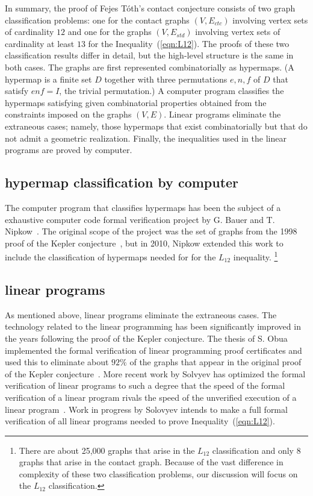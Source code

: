 \documentclass{llncs}
\begin{document}
In summary, the proof of Fejes T\'oth's contact conjecture consists of
two graph classification problems: one for the contact graphs
$(V,E_{ctc})$ involving vertex sets of cardinality $12$ and one for
the graphs $(V,E_{std})$ involving vertex sets of cardinality at least
$13$ for the Inequality~(\ref{eqn:L12}).  The proofs of these two
classification results differ in detail, but the high-level structure
is the same in both cases.  The graphs are first represented
combinatorially as hypermaps.  (A hypermap is a finite set $D$
together with three permutations $e,n,f$ of $D$ that satisfy $e n f =
I$, the trivial permutation.)  A computer program classifies the
hypermaps satisfying given combinatorial properties obtained from the
constraints imposed on the graphs $(V,E)$.  Linear programs eliminate
the extraneous cases; namely, those hypermaps that exist
combinatorially but that do not admit a geometric realization.
Finally, the inequalities used in the linear programs are proved by
computer.

\subsection{hypermap classification by computer}

The computer program that classifies hypermaps has been the subject of
a exhaustive computer code formal verification project by G. Bauer and
T. Nipkow~\cite{Nipkow:2005:Tame}.  The original scope of the project
was the set of graphs from the 1998 proof of the Kepler
conjecture~\cite{Hales:2006:DCG}, but in 2010, Nipkow extended this
work to include the classification of hypermaps needed for for the
$L_{12}$ inequality.  \footnote{There are about 25,000 graphs that
  arise in the $L_{12}$ classification and only $8$ graphs that arise
  in the contact graph.  Because of the vast difference in complexity
  of these two classification problems, our discussion will focus on
  the $L_{12}$ classification.}


\subsection{linear programs}

As mentioned above, linear programs eliminate the extraneous cases.
The technology related to the linear programming has been
significantly improved in the years following the proof of the Kepler
conjecture.  The thesis of S. Obua implemented
the formal verification of linear programming proof certificates and
used this to eliminate about $92\%$ of the graphs that appear in the
original proof of the Kepler conjecture~\cite{Obua:2008:Thesis}.  More
recent work by Solvyev has optimized the formal verification of linear
programs to such a degree that the speed of the formal verification of
a linear program rivals the speed of the unverified execution of a
linear program~\cite{Solovyev:LP}.  Work in progress by Solovyev
intends to make a full formal verification of all linear programs needed to
prove Inequality~(\ref{eqn:L12}).
\end{document}
